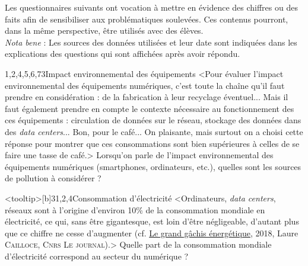 \begin{quiz}[title={Numérique et environnement}]
Les questionnaires suivants ont vocation à mettre en évidence des chiffres ou des faits afin de sensibiliser aux problématiques soulevées. Ces contenus pourront, dans la même perspective, être utilisés avec des élèves.\\
\textit{Nota bene} : Les sources des données utilisées et leur date sont indiquées dans les explications des questions qui sont affichées après avoir répondu.

\begin{quizquestion}[t]{1,2,4,5,6,7}{3}{Impact environnemental des équipements}
<Pour évaluer l'impact environnemental des équipements numériques, c'est toute la chaîne qu'il faut prendre en considération : de la fabrication à leur recyclage éventuel... Mais il faut également prendre en compte le contexte nécessaire au fonctionnement des ces équipements : circulation de données sur le réseau, stockage des données dans des \textit{data centers}... Bon, pour le café... On plaisante, mais surtout on a choisi cette réponse pour montrer que ces consommations sont bien supérieures à celles de se faire une tasse de café.>
Lorsqu'on parle de l'impact environnemental des équipements numériques (smartphones, ordinateurs, etc.), quelles sont les sources de pollution à considérer ? 
\end{quizquestion}


\begin{quizquestion*}<tooltip>[b]{3}{1,2,4}{Consommation d'électricité}
<Ordinateurs, \textit{data centers}, réseaux sont à l'origine d'environ 10\% de la consommation mondiale en électricité, ce qui, sans être gigantesque, est loin d'être négligeable, d'autant plus que ce chiffre ne cesse d’augmenter (cf. \href{https://lejournal.cnrs.fr/articles/numerique-le-grand-gachis-energetique}{Le grand gâchis énergétique}, 2018, Laure \textsc{Cailloce}, \textsc{Cnrs Le journal}).>
Quelle part de la consommation mondiale d’électricité correspond au secteur du numérique ?
\end{quizquestion*}


\end{quiz}
